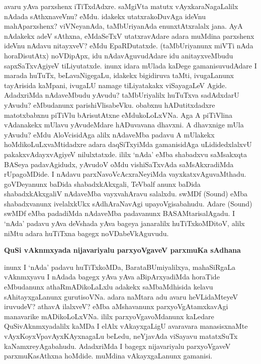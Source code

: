 \noindent
avaru yAva parxshenx iTiTxdAdxre. saMgiVta matutx vAyxkaraNagaLalilx nAdada sAthxnaveVnu? eMdu. idakekx utatxrakoDuvAga ideVnu mahAparxshenx? viVNeyanAda, taMbUriyanAda enunxtAtxralalx jana. AyA nAdakekx adeV sAthxna, eMdaSeTxV utatxravAdare adara muMdina parxshenx ideVnu nAdavu nitayxveV? eMdu EpaRDutatxde. (taMbUriyanunx miVTi nAda horaDisutAtx) noVDipApx, idu nAdavAguvudAdare idu anitayxveMbudu sapxSaTxvAgiyeV tiLiyutatxde. inunx idara mUlada kaDege gamanisuvudAdare I marada huTuTx, beLavaNigegaLu, idakekx bigidiruva taMti, ivugaLanunx tayArisida kaMpani, ivugaLU namage\- tiLiyatakakx viSayagaLeV Agide. AdadxriMda nAdaveMbudu yAvudu? taMbUriyalilx huTuTxva sadAdx\-darU yAvudu? eMbudanunx parishiVlisabeVku. obabxnu hADutitxdadxre matotxbabxnu piTiVlu bArisu\-tAtxne eMdukoLoLxVNa. Aga A piTiVlina vAdanakekx mUlavu yAvudeMdare hADuvavana dhavxni. A dhavxnige mUla yAvudu? eMdu AloVcisidAga alilx nAdaveMba padavu A mUlakekx hoMdikoLuLxvaMti\-dadxre adara daqSiTxyiMda gamanisidAga uLididedxlalxvU pakakxvAdayxvAgiyeV nilulxtatxde. ililx `nAda' eMba shabadxvu saMsakxqta BASeya padavAgidudx, yAvudoV oMdu vishiSaTxvAda saMsAkxradiMda rUpagoMDide. I nAdavu parxNavoVcAcxraNeyiMda vayxkatxvAguvaMthadu. goVDeyanunx baDida shabadxkAkxgali, TeVbalf anunx baDida shabadxkAkxgaliV nAdaveMba vayxvahAravu salalxdu. swMDf {\rm (Sound)} eMba shabadxvanunx ivelalxkUkx sAdhA\-raNavAgi upayoVgisabahudu. Adare {\rm (Sound)} swMDf eMba padadiMda nAdaveMba pada\-vanunx BASAMtarisalAgadu. I `nAda' padavu yAva deVshada yAva bageya janaralilx huTiTxkoMDitoV, alilx niMtu adara huTiTxna bagegx noVDabeVkAguvudu.

{\bigskip
\noindent
{\large\bf QuSi vAknmxyada nijavariyalu parxyoVgaveV parxmuKa sAdhana}}\label{page143}
\medskip

\noindent
inunx I `nAda' padavu huTiTxkoMDa, BarataBUmiyalilxya, mahaSiRgaLa vAknmxyavu I nAdada bagegx yAva yAva aBipArxyadiMda horaTide eMbudanunx athaRmADikoLaLxlu adakekx saMbaMdhisida kelavu sAhitayxgaLanunx gurutisoVNa. adara naMtara adu avaru heVLidaMteyeV iruvudeV? athavA ilalxveV? eMba aMshavanunx parxyoVgAtamxkavAgi manavarike mADikoLoLxVNa. ililx parxyoVgavoMdanunx kaLedare QuSivAknmxyadalilx kaMDa I elAlx vAkayxgaLigU avaravara manasisxnaMte vAyxKoyxVpavAyxKAyxnagaLu beLedu, neYjavAda viSayavu matatxSuTx kaNamxreyAgabahudu. AdadxriMda I bagegx nijavariyalu parxyoV\-gaveV parxmuKasAthxna hoMdide. muMdina vAkayxgaLanunx gamanisi.

